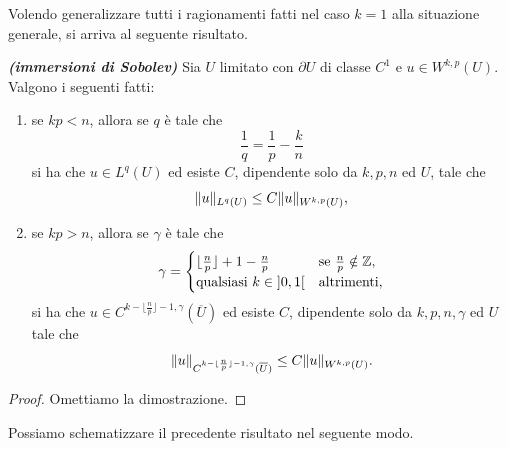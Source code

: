 Volendo generalizzare tutti i ragionamenti fatti nel caso $k=1$ alla situazione generale, si arriva al seguente risultato.
\begin{teorema}\textbf{\emph{(immersioni di Sobolev)}}
	Sia $U$ limitato con $\partial U$ di classe $C^1$ e $u \in W^{k,p}(U)$. Valgono i seguenti fatti:
	\begin{enumerate}[$(a)$]
		\item se $kp < n$, allora se $q$ è tale che
		\[ \frac{1}{q} = \frac{1}{p}-\frac{k}{n} \]
		si ha che $u \in L^q(U)$ ed esiste $C$, dipendente solo da $k,p,n$ ed $U$, tale che
		\[ \lVert u\rVert_{L^q(U)} \le C\lVert u\rVert_{W^{k,p}(U)}, \]
		\item se $kp > n$, allora se $\gamma$ è tale che
		\[ \gamma = \begin{cases}
			\lfloor\frac{n}{p}\rfloor +1 - \frac{n}{p} & \textup{se } \frac{n}{p} \notin \mathbb{Z}, \\
			\textup{qualsiasi } k \in \left] 0,1\right[ & \textup{altrimenti},
		\end{cases} \]
		si ha che $u \in C^{k - \lfloor\frac{n}{p}\rfloor  -1,\gamma}(\overline{U})$ ed esiste $C$, dipendente solo da $k,p,n,\gamma$ ed $U$ tale che
		\[ \lVert u\rVert_{C^{k - \lfloor\frac{n}{p}\rfloor  -1,\gamma}(\overline{U})} \le C\lVert u\rVert_{W^{k,p}(U)}.\]
	\end{enumerate}
\end{teorema}
\begin{proof}
	Omettiamo la dimostrazione.
\end{proof}
Possiamo schematizzare il precedente risultato nel seguente modo.
